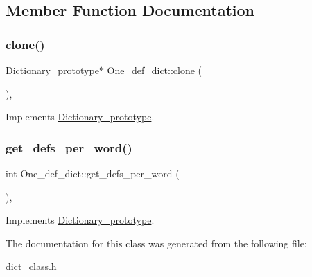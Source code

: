 \subsection{Member Function Documentation}
\mbox{\label{class_one__def__dict_a1824ad06343b0c10571c9c34b995d6ee}} 
\subsubsection{\texorpdfstring{clone()}{clone()}}
{\footnotesize\ttfamily \mbox{\hyperlink{class_dictionary__prototype}{Dictionary\+\_\+prototype}}$\ast$ One\+\_\+def\+\_\+dict\+::clone (\begin{DoxyParamCaption}{ }\end{DoxyParamCaption})\hspace{0.3cm}{\ttfamily [inline]}, {\ttfamily [virtual]}}



Implements \mbox{\hyperlink{class_dictionary__prototype_ac06fe410a511be7ee85ba07cf69b9418}{Dictionary\+\_\+prototype}}.

\mbox{\label{class_one__def__dict_ab3c5cd3f8f8ae83ebb39d7c8e11627e5}} 
\subsubsection{\texorpdfstring{get\_defs\_per\_word()}{get\_defs\_per\_word()}}
{\footnotesize\ttfamily int One\+\_\+def\+\_\+dict\+::get\+\_\+defs\+\_\+per\+\_\+word (\begin{DoxyParamCaption}{ }\end{DoxyParamCaption})\hspace{0.3cm}{\ttfamily [inline]}, {\ttfamily [virtual]}}



Implements \mbox{\hyperlink{class_dictionary__prototype_a4f9e8f9c02d878faac1021f9c31da736}{Dictionary\+\_\+prototype}}.



The documentation for this class was generated from the following file\+:\begin{DoxyCompactItemize}
\item 
\mbox{\hyperlink{dict__class_8h}{dict\+\_\+class.\+h}}\end{DoxyCompactItemize}
